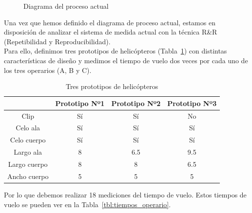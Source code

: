 \documentclass[12pt,a4paper,twoside,openright,titlepage,final]{article}
\begin{document}
\begin{figure}[htbp!]
	\caption{Diagrama del proceso actual}
	\label{fig:diagrama_proceso_actual}
\end{figure} 

Una vez que hemos definido el diagrama de proceso actual, estamos en disposición de analizar el sistema de medida actual con la técnica R\&R (Repetibilidad y Reproducibilidad).\\

Para ello, definimos tres prototipos de helicópteros (Tabla~\ref{tbl:prototipos}) con distintas características de diseño y medimos el tiempo de vuelo dos veces por cada uno de los tres operarios (A, B y C).\\

\begin{table}[htbp!]
	\centering
	\caption{Tres prototipos de helicópteros}
	\label{tbl:prototipos}
	\begin{tabular}{@{}cccc@{}}
		\cmidrule(l){2-4}
		& Prototipo Nº1 & Prototipo Nº2 & Prototipo Nº3 \\ \midrule
		Clip         & Sí            & Sí            & No            \\
		Celo ala     & Sí            & Sí            & Sí            \\
		Celo cuerpo  & Sí            & Sí            & Sí            \\
		Largo ala    & 8             & 6.5           & 9.5           \\
		Largo cuerpo & 8             & 8             & 6.5           \\
		Ancho cuerpo & 5             & 5             & 5             \\ \bottomrule
	\end{tabular}
\end{table}

Por lo que debemos realizar 18 mediciones del tiempo de vuelo. Estos tiempos de vuelo se pueden ver en la Tabla~\ref{tbl:tiempos_operario}.
\end{document}

